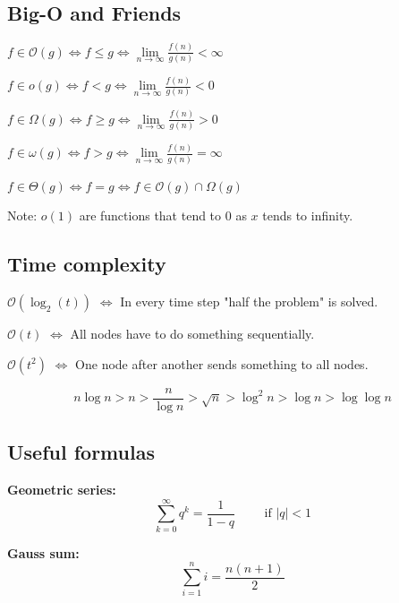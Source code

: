 \documentclass[a4paper, 8pt, landscape]{scrartcl}
\begin{document}
\begin{multicols*}{3}
\subsection{Big-O and Friends}

\begin{compactitem}
\item $f \in \mathcal{O}(g) \Leftrightarrow f \leq g \Leftrightarrow \lim\limits_{n\rightarrow \infty} \frac{f(n)}{g(n)} < \infty$
\item $f \in o(g) \Leftrightarrow f < g \Leftrightarrow \lim\limits_{n\rightarrow \infty} \frac{f(n)}{g(n)} < 0$
\item $f \in \Omega(g) \Leftrightarrow f \geq g \Leftrightarrow \lim\limits_{n\rightarrow \infty} \frac{f(n)}{g(n)} > 0$
\item $f \in \omega(g) \Leftrightarrow f > g \Leftrightarrow \lim\limits_{n\rightarrow \infty} \frac{f(n)}{g(n)} = \infty$
\item $f \in \Theta(g) \Leftrightarrow f = g \Leftrightarrow f \in \mathcal{O}(g) \cap \Omega(g)$
\end{compactitem}

Note: $o(1)$ are functions that tend to 0 as $x$ tends to infinity.


\subsection{Time complexity}

\begin{compactitem}
\item $\mathcal{O}(\log_2(t))$ $\Leftrightarrow$ In every time step "half the problem" is solved.
\item $\mathcal{O}(t)$ $\Leftrightarrow$ All nodes have to do something sequentially.
\item $\mathcal{O}(t^2)$ $\Leftrightarrow$ One node after another sends something to all nodes.
\end{compactitem}

$$n\log n > n > \frac{n}{\log n} > \sqrt{n} > \log^2 n > \log n > \log\log n$$


\subsection{Useful formulas}

\textbf{Geometric series:} $$\sum_{k=0}^{\infty} q^k = \frac{1}{1-q} \qquad \text{ if } |q| < 1$$

\textbf{Gauss sum:} $$\sum_{i=1}^{n} i = \frac{n(n+1)}{2}$$


\end{multicols*}
\end{document}

